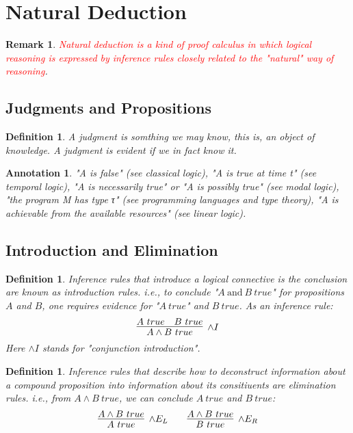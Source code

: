 \documentclass{article}
\theoremstyle{plain}
\newtheorem{definition}[theorem]{Definition}
\newtheorem{remark}[theorem]{Remark}
\newtheorem{annotation}[theorem]{Annotation}
\theoremstyle{nonumberplain}
\newcommand{\redt}[1]{\textcolor{red}{#1}}
\begin{document}
\newpage
\section{Natural Deduction}

\begin{remark}
\rm \redt{Natural deduction is a kind of proof calculus in which logical reasoning is expressed by inference rules closely related to the "natural" way of reasoning}. 
\end{remark}

\subsection{Judgments and Propositions}

\begin{definition}
\rm A \emph{judgment} is somthing we may know, this is, an object of knowledge. A judgment is \emph{evident} if we in fact know it.
\end{definition}

\begin{annotation}
\rm "A is false" (see classical logic), "A is true at time t" (see temporal logic), "A is necessarily true" or "A is possibly true" (see modal logic), "the program M has type τ" (see programming languages and type theory), "A is achievable from the available resources" (see linear logic). 
\end{annotation}


\subsection{Introduction and Elimination}

\begin{definition}
\rm Inference rules that introduce a logical connective is the conclusion are known as \emph{introduction rules}. i.e., to conclude "$A~\text{and}~B~true$" for propositions $A$ and $B$, one requires evidence for "$A~true$" and $B~true$. As an inference rule:
$$
\infer[\wedge I]{A \wedge B ~true}{A~true & B~true}
$$
Here $\wedge I$ stands for "conjunction introduction".
\end{definition}

\begin{definition}
\rm Inference rules that describe how to deconstruct information about a compound proposition into information about its consitiuents are elimination rules. i.e., from $A \wedge B~true$, we can conclude $A~true$ and $B~true$:
$$
\infer[\wedge E_L]{A~true}{A \wedge B ~true}~~~~~~\infer[\wedge E_R]{B~true}{A \wedge B ~true} 
$$
\end{definition}
\end{document}
